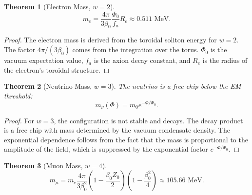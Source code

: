 \documentclass[12pt,oneside]{book}
\newtheorem{theorem}{Theorem}[chapter]
\begin{document}
\begin{theorem}[Electron Mass, $w = 2$]
\[
m_e = \frac{4\pi}{3\beta_0}\frac{\Phi_0}{f_a} R_e \approx 0.511 \text{ MeV}.
\]
\end{theorem}

\begin{proof}
The electron mass is derived from the toroidal soliton energy for $w = 2$. The factor $4\pi/(3\beta_0)$ comes from the integration over the torus. $\Phi_0$ is the vacuum expectation value, $f_a$ is the axion decay constant, and $R_e$ is the radius of the electron's toroidal structure.
\end{proof}

\begin{theorem}[Neutrino Mass, $w = 3$]
The neutrino is a free chip below the EM threshold:
\[
m_\nu(\Phi) = m_0 e^{-\Phi/\Phi_0}.
\]
\end{theorem}

\begin{proof}
For $w = 3$, the configuration is not stable and decays. The decay product is a free chip with mass determined by the vacuum condensate density. The exponential dependence follows from the fact that the mass is proportional to the amplitude of the field, which is suppressed by the exponential factor $e^{-\Phi/\Phi_0}$.
\end{proof}

\begin{theorem}[Muon Mass, $w = 4$]
\[
m_\mu = m_e \frac{4\pi}{3\beta_0^2} \left(1 - \frac{\beta_0 Z_0}{2}\right) \left(1 - \frac{\beta_0^2}{4}\right) \approx 105.66 \text{ MeV}.
\]
\end{theorem}
\end{document}
